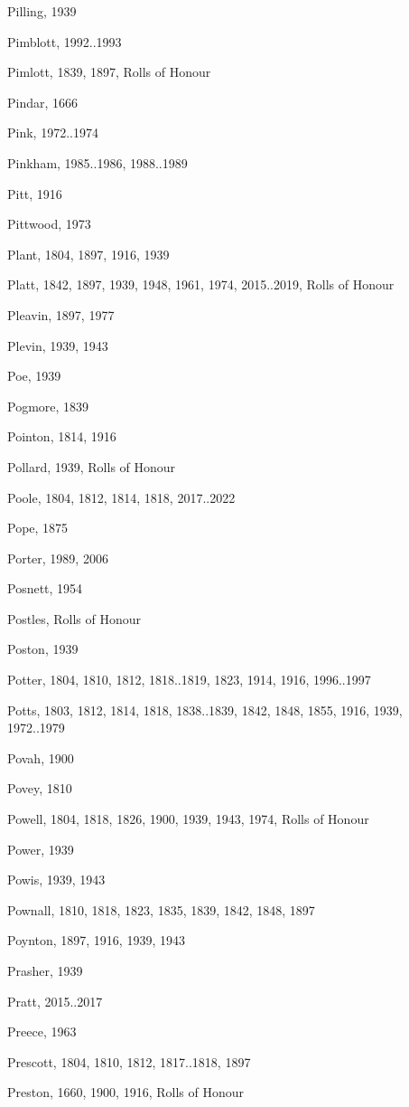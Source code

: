 \begin{theindex}
\item Pilling, 1939
\item Pimblott, 1992..1993
\item Pimlott, 1839, 1897, Rolls of Honour
\item Pindar, 1666
\item Pink, 1972..1974
\item Pinkham, 1985..1986, 1988..1989
\item Pitt, 1916
\item Pittwood, 1973
\item Plant, 1804, 1897, 1916, 1939
\item Platt, 1842, 1897, 1939, 1948, 1961, 1974, 2015..2019, Rolls of Honour
\item Pleavin, 1897, 1977
\item Plevin, 1939, 1943
\item Poe, 1939
\item Pogmore, 1839
\item Pointon, 1814, 1916
\item Pollard, 1939, Rolls of Honour
\item Poole, 1804, 1812, 1814, 1818, 2017..2022
\item Pope, 1875
\item Porter, 1989, 2006
\item Posnett, 1954
\item Postles, Rolls of Honour
\item Poston, 1939
\item Potter, 1804, 1810, 1812, 1818..1819, 1823, 1914, 1916, 1996..1997
\item Potts, 1803, 1812, 1814, 1818, 1838..1839, 1842, 1848, 1855, 1916, 1939, 1972..1979
\item Povah, 1900
\item Povey, 1810
\item Powell, 1804, 1818, 1826, 1900, 1939, 1943, 1974, Rolls of Honour
\item Power, 1939
\item Powis, 1939, 1943
\item Pownall, 1810, 1818, 1823, 1835, 1839, 1842, 1848, 1897
\item Poynton, 1897, 1916, 1939, 1943
\item Prasher, 1939
\item Pratt, 2015..2017
\item Preece, 1963
\item Prescott, 1804, 1810, 1812, 1817..1818, 1897
\item Preston, 1660, 1900, 1916, Rolls of Honour

\end{theindex}
